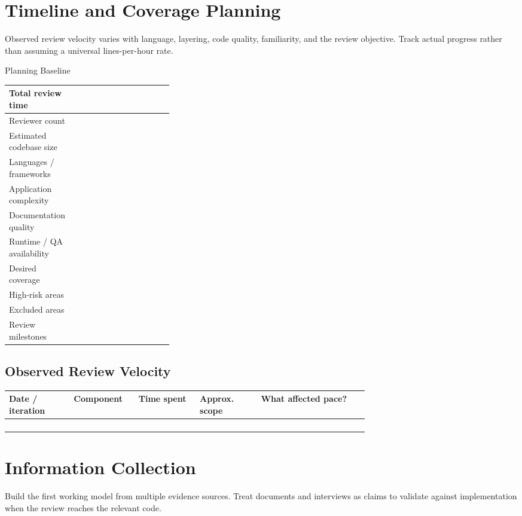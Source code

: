 \documentclass[10pt]{article}
\begin{document}
\section{Timeline and Coverage Planning}
Observed review velocity varies with language, layering, code quality, familiarity, and the review objective. Track actual progress rather than assuming a universal lines-per-hour rate.

\begin{worksheetbox}{Planning Baseline}
\par\smallskip\noindent\begin{tabularx}{\linewidth}{@{}L{0.32\linewidth}Y@{}}
Total review time & \\ \midrule
Reviewer count & \\ \midrule
Estimated codebase size & \\ \midrule
Languages / frameworks & \\ \midrule
Application complexity & \\ \midrule
Documentation quality & \\ \midrule
Runtime / QA availability & \\ \midrule
Desired coverage & \\ \midrule
High-risk areas & \\ \midrule
Excluded areas & \\ \midrule
Review milestones & \\ 
\end{tabularx}
\end{worksheetbox}

\subsection{Observed Review Velocity}
\par\smallskip\noindent\begin{tabularx}{\linewidth}{@{}L{0.18\linewidth}L{0.18\linewidth}L{0.17\linewidth}L{0.17\linewidth}Y@{}}
\toprule
Date / iteration & Component & Time spent & Approx. scope & What affected pace? \\
\midrule
\rule{0pt}{2.4em} & & & & \\
\rule{0pt}{2.4em} & & & & \\
\rule{0pt}{2.4em} & & & & \\
\rule{0pt}{2.4em} & & & & \\
\bottomrule
\end{tabularx}
\clearpage

\section{Information Collection}
Build the first working model from multiple evidence sources. Treat documents and interviews as claims to validate against implementation when the review reaches the relevant code.
\end{document}
